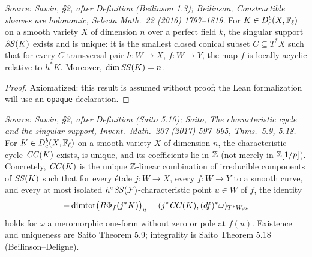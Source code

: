 \begin{theorem}
  \label{thm:beilinson_ss}
  \textit{Source: Sawin, §2, after Definition (Beilinson 1.3); Beilinson,
  \emph{Constructible sheaves are holonomic}, Selecta Math.\ 22 (2016) 1797--1819.}
  For $K\in D^b_c(X,\mathbb{F}_\ell)$ on a smooth variety $X$ of dimension $n$ over a
  perfect field $k$, the singular support $\mathit{SS}(K)$ exists and is unique: it is the
  smallest closed conical subset $C\subseteq T^*X$ such that for every $C$-transversal
  pair $h:W\to X$, $f:W\to Y$, the map $f$ is locally acyclic relative to $h^*K$.
  Moreover, $\dim\mathit{SS}(K)=n$.
\end{theorem}

\begin{proof}
  Axiomatized: this result is assumed without proof; the Lean formalization will use
  an \texttt{opaque} declaration.
\end{proof}

\begin{theorem}
  \label{thm:saito_cc_exists}
  \textit{Source: Sawin, §2, after Definition (Saito 5.10); Saito,
  \emph{The characteristic cycle and the singular support}, Invent.\ Math.\ 207
  (2017) 597--695, Thms.\ 5.9, 5.18.}
  For $K\in D^b_c(X,\mathbb{F}_\ell)$ on a smooth variety $X$ of dimension $n$, the
  characteristic cycle $\mathit{CC}(K)$ exists, is unique, and its coefficients lie in
  $\mathbb{Z}$ (not merely in $\mathbb{Z}[1/p]$).  Concretely, $\mathit{CC}(K)$ is the unique
  $\mathbb{Z}$-linear combination of irreducible components of $\mathit{SS}(K)$ such that for
  every étale $j:W\to X$, every $f:W\to Y$ to a smooth curve, and every at most
  isolated $h^\circ\mathit{SS}(\mathcal{F})$-characteristic point $u\in W$ of $f$, the identity
  \[ -\operatorname{dimtot}\bigl(R\Phi_f(j^*K)\bigr)_u = (j^*\mathit{CC}(K),(df)^*\omega)_{T^*W,u} \]
  holds for $\omega$ a meromorphic one-form without zero or pole at $f(u)$.
  Existence and uniqueness are Saito Theorem 5.9; integrality is Saito Theorem 5.18
  (Beilinson--Deligne).
\end{theorem}


